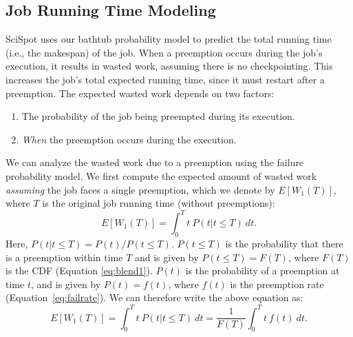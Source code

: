

\vspace*{\subsecspace}
\subsection{Job Running Time Modeling}

SciSpot uses our bathtub probability model to predict the total running time (i.e., the makespan) of the job. 
%
When a preemption occurs during the job's execution, it results in wasted work, assuming there is no checkpointing. 
This increases the job's total expected running time, since it must restart after a preemption.
%
The expected wasted work depends on two factors:
\begin{enumerate} [leftmargin=12pt]
\item The probability of the job being preempted during its execution. 
\item \emph{When} the preemption occurs during the execution. 
\end{enumerate}

We can analyze the wasted work due to a preemption using the failure probability model.
We first compute the expected amount of wasted work \emph{assuming} the job faces a single preemption, which we denote by $E[W_1(T)]$, where $T$ is the original job running time (without preemptions):
\begin{equation}
E[W_1(T)] = \int_0^{T} t~P(t | t \leq T)~dt.
\end{equation}
Here, $P(t|t\leq T) = P(t) / P(t \leq T)$. $P(t\leq T)$ is the probability that there is a preemption within time $T$ and is given by $P(t \leq T) = F(T)$, where $F(T)$ is the CDF (Equation \ref{eq:blend1}). 
$P(t)$ is the probability of a preemption at time $t$, and is given by $P(t) = f(t)$, where $f(t)$ is the preemption rate (Equation~\ref{eq:failrate}).
We can therefore write the above equation as:
\begin{equation}
  E[W_1(T)] = \int_0^{T} t~P(t | t \leq T)~dt = \frac{1}{F(T)}  \int_0^{T} t~f(t)~dt.
    \label{eq:wasted}
\end{equation}


